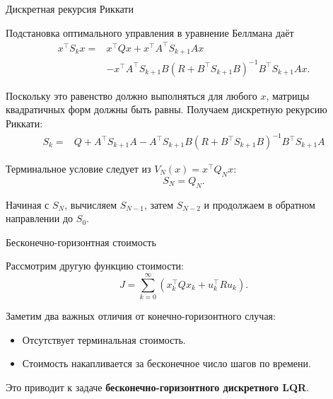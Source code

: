 \documentclass{beamer}
\begin{document}
	\begin{frame}{Дискретная рекурсия Риккати}
		\begin{flushleft}
			
			Подстановка оптимального управления в уравнение Беллмана
			даёт
			\[
			\begin{aligned}
				x^\top S_kx
				={}&x^\top Qx+x^\top A^\top S_{k+1}Ax\\
				&-x^\top A^\top S_{k+1}B (R+B^\top S_{k+1}B)^{-1} B^\top S_{k+1}Ax.
			\end{aligned}
			\]
			
			\medskip
			
			Поскольку это равенство должно выполняться для любого $x$,
			матрицы квадратичных форм должны быть равны.
			Получаем дискретную рекурсию Риккати:
			\[
			\boxed{
				\begin{aligned}
					S_k={}&Q+A^\top S_{k+1}A-A^\top S_{k+1}B
					(R+B^\top S_{k+1}B)^{-1} B^\top S_{k+1}A
				\end{aligned}
			}
			\]
			
			\medskip
			
			Терминальное условие следует из
			$V_N(x)=x^\top Q_Nx$:
			\[
			S_N=Q_N.
			\]
			
			Начиная с $S_N$, вычисляем $S_{N-1}$,
			затем $S_{N-2}$ и продолжаем в обратном направлении до $S_0$.
			
		\end{flushleft}
	\end{frame}
	
	
	
	
	\begin{frame}{Бесконечно-горизонтная стоимость}
		\begin{flushleft}
			
			Рассмотрим другую функцию стоимости:
			\[
			J=\sum_{k=0}^{\infty}
			\left(x_k^\top Qx_k+u_k^\top Ru_k\right).
			\]
			
			\medskip
			
			Заметим два важных отличия от конечно-горизонтного
			случая:
			\begin{itemize}
				\item Отсутствует терминальная стоимость.
				\item Стоимость накапливается за бесконечное
				число шагов по времени.
			\end{itemize}
			
			\medskip
			
			Это приводит к задаче \textbf{бесконечно-горизонтного
				дискретного LQR}.
			
		\end{flushleft}
	\end{frame}
	
\end{document}
